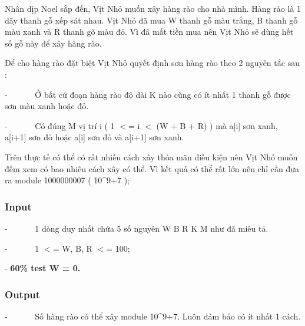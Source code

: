 



   Nhân dịp Noel sắp đến, Vịt Nhỏ muốn xây hàng rào cho nhà mình. Hàng rào là 1 dãy thanh gỗ xếp sát nhau. Vịt Nhỏ đã mua W thanh gỗ màu trắng, B thanh gỗ màu xanh và R thanh gõ màu đỏ. Vì đã mất tiền mua nên Vịt Nhỏ sẽ dùng hết số gỗ này để xây hàng rào.  

   Để cho hàng rào đặt biệt Vịt Nhỏ quyết định sơn hàng rào theo 2 nguyên tắc sau :  

   -       Ở bất cứ đoạn hàng rào độ dài K nào cũng có ít nhất 1 thanh gỗ được sơn màu xanh hoặc đỏ.  

   -       Có đúng M vị trí i ( 1 $<$= i $<$ (W + B + R) ) mà a[i] sơn xanh, a[i+1] sơn đỏ hoặc a[i] sơn đỏ và a[i+1] sơn xanh.  

   Trên thực tế có thể có rất nhiều cách xây thỏa mãn điều kiện nên Vịt Nhỏ muốn đếm xem có bao nhiêu cách xây có thể. Vì kết quả có thể rất lớn nên chỉ cần đưa ra module 1000000007 ( 10\textasciicircum9+7 );  

\subsubsection{   Input  }

   -       1 dòng duy nhất chứa 5 số nguyên W B R K M như đã miêu tả.  

   -       1 $<$= W, B, R $<$= 100;  

   -   \textbf{    60\% test W = 0.   }

\subsubsection{   Output  }

   -       Số hàng rào có thể xây module 10\textasciicircum9+7. Luôn đảm bảo có ít nhất 1 cách.  


